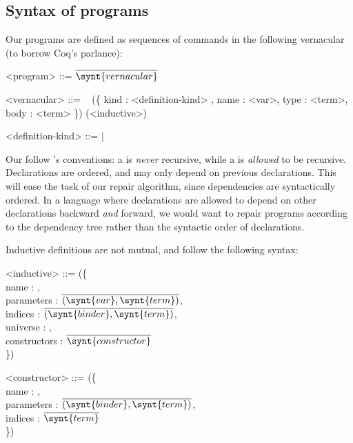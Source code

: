 \subsection{Syntax of \Chick{} programs}\label{chick-syntax-programs}

Our programs are defined as sequences of commands in the following vernacular
(to borrow Coq's parlance):

\begin{grammar}
<program> ::= $\overline{ \synt{vernacular} }$

<vernacular> ::= \ %
\alt {}(\{ kind : <definition-kind> , name : <var>, type : <term>, body : <term> \})
\alt {}(<inductive>)

<definition-kind> ::=  | 
\end{grammar}

Our  follow \Coq{}'s \Vernacular{} conventions: a
 is \emph{never} recursive, while a 
is \emph{allowed} to be recursive.  Declarations are ordered, and may only
depend on previous declarations.  This will ease the task of our repair
algorithm, since dependencies are syntactically ordered.  In a language where
declarations are allowed to depend on other declarations backward \emph{and}
forward, we would want to repair programs according to the dependency tree
rather than the syntactic order of declarations.

Inductive definitions are not mutual, and follow the following syntax:

\noindent
\begin{grammar}
<inductive> ::= (\{\\
name : ,\\
parameters : $\overline{ ( \synt{var} , \synt{term} ) }$,\\
indices : $\overline{ ( \synt{binder} , \synt{term} ) }$,\\
universe : ,\\
constructors : $\overline{ \synt{constructor} }$\\
\})

<constructor> ::= (\{\\
name : ,\\
parameters : $\overline{ ( \synt{binder}, \synt{term} ) }$,\\
indices : $\overline{ \synt{term} }$\\
\})
\end{grammar}

